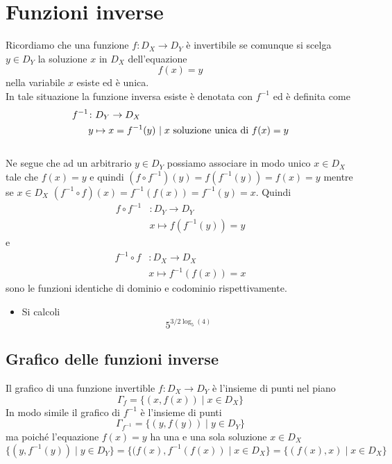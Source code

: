 \documentclass[onecolumn,11pt]{book}
\begin{document}
\section{Funzioni inverse}
Ricordiamo che una funzione $f\colon D_X\rightarrow D_Y$
\`e invertibile se comunque si scelga $y\in D_Y$ la soluzione $x$ in $D_X$ dell'equazione
\[f(x)=y \]
nella variabile $x$ esiste ed \`e unica.
\\
In tale situazione la funzione inversa esiste \`e denotata con $f^{-1}$ ed  \`e definita come
\begin{align*}     f^{-1}&\colon D_Y\rightarrow D_X
\\
&y\mapsto x=f^{-1}(y) \hbox{ $\mid x$ soluzione unica di } f(x)=y\end{align*}
\\
Ne segue che ad un arbitrario $y\in D_Y$  possiamo associare in modo unico $x\in D_X$ tale che $f(x)=y$  e quindi
$(f\circ f^{-1})(y)=f(f^{-1}(y))=f(x)=y$  mentre se $x \in D_X$ $(f^{-1}\circ f)(x)= f^{-1}(f(x))=f^{-1}(y)=x$.  Quindi
\begin{align}  f\circ f^{-1}&\colon D_Y\rightarrow D_Y
\\
&x\mapsto f(f^{-1}(y))=y\end{align}
 e
\begin{align*} f^{-1} \circ f&\colon D_X\rightarrow D_X
\\
&x\mapsto f^{-1}(f(x))=x\end{align*}
sono le funzioni identiche di dominio e codominio rispettivamente.
\begin{itemize}
\item Si calcoli
\[5^{3/2 \log_{5}(4)}\]
\end{itemize}
\subsection{Grafico delle funzioni inverse}
Il grafico di una funzione invertible
$f\colon D_X\rightarrow D_Y$ \`e
l'insieme di punti nel piano
\[\Gamma_f=\{(x,f(x))\mid x \in D_X\}\]
In modo simile il grafico di $f^{-1}$ \`e l'insieme di punti
\[\Gamma_{f^{-1}}=\{(y,f(y))\mid y \in D_Y\}\]
ma poich\'e l'equazione $f(x)=y$ ha una e una sola soluzione $x\in D_X$
\[\{(y,f^{-1}(y))\mid y \in D_Y\}=\{(f(x),f^{-1}(f(x))\mid x \in D_X\}=\{(f(x),x)\mid x \in D_X\}\]
\end{document}
